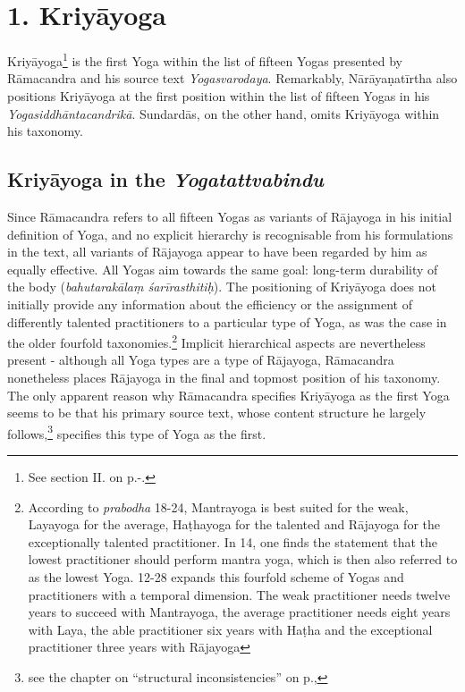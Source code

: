 \section{1. Kriyāyoga}

Kriyāyoga\footnote{See section II. on p.\pageref{kriyayogastart}-\pageref{kriyayogaend}.} is the first Yoga within the list of fifteen Yogas presented by Rāmacandra and his source text \textit{Yogasvarodaya}. Remarkably, Nārāyaṇatīrtha also positions Kriyāyoga at the first position within the list of fifteen Yogas in his \textit{Yogasiddhāntacandrikā}. Sundardās, on the other hand, omits Kriyāyoga within his taxonomy.

\subsection{Kriyāyoga in the \textit{Yogatattvabindu}}

Since Rāmacandra refers to all fifteen Yogas as variants of Rājayoga in his initial definition of Yoga, and no explicit hierarchy is recognisable from his formulations in the text, all variants of Rājayoga appear to have been regarded by him as equally effective. All Yogas aim towards the same goal: long-term durability of the body (\textit{bahutarakālaṃ śarīrasthitiḥ}). The positioning of Kriyāyoga does not initially provide any information about the efficiency or the assignment of differently talented practitioners to a particular type of Yoga, as was the case in the older fourfold taxonomies.\footnote{According to \textit{prabodha} 18-24, Mantrayoga is best suited for the weak, Layayoga for the average, Haṭhayoga for the talented and Rājayoga for the exceptionally talented practitioner. In  14, one finds the statement that the lowest practitioner should perform mantra yoga, which is then also referred to as the lowest Yoga.  12-28 expands this fourfold scheme of Yogas and practitioners with a temporal dimension. The weak practitioner needs twelve years to succeed with Mantrayoga, the average practitioner needs eight years with Laya, the able practitioner six years with Haṭha and the exceptional practitioner three years with Rājayoga} Implicit hierarchical aspects are nevertheless present - although all Yoga types are a type of Rājayoga, Rāmacandra nonetheless places Rājayoga in the final and topmost position of his taxonomy.
The only apparent reason why Rāmacandra specifies Kriyāyoga as the first Yoga seems to be that his primary source text, whose content structure he largely follows,\footnote{see the chapter on ``structural inconsistencies'' on p.\pageref{struktur},} specifies this type of Yoga as the first.

